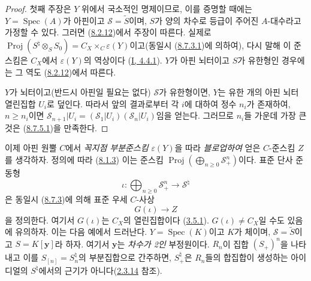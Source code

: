 \begin{proof}
첫째 주장은 $Y$ 위에서 국소적인 명제이므로, 이를 증명할 때에는
$Y=\operatorname{Spec}(A)$가 아핀이고 $\mathcal{S}=\widetilde{S}$이며,
$S$가 양의 차수로 등급이 주어진 $A$-대수라고 가정할 수 있다. 그러면
(\hyperref[II.8.2.12-ko]{8.2.12})에서 주장이 따른다. 실제로
$\operatorname{Proj}(S^{\natural}\otimes_S S_0)=
C_X\times_C\varepsilon(Y)$이고(동일시
(\hyperref[II.8.7.3.1-ko]{8.7.3.1})에 의하여), 다시 말해 이 준스킴은
$C_X$에서 $\varepsilon(Y)$의 역상이다
(\hyperref[I.4.4.1-ko]{I, 4.4.1}). $Y$가 아핀 뇌터이고 $S$가
유한형인 경우에는 그 역도 (\hyperref[II.8.2.12-ko]{8.2.12})에서 따른다.

$Y$가 뇌터이고(반드시 아핀일 필요는 없다) $\mathcal{S}$가 유한형이면,
$Y$는 유한 개의 아핀 뇌터 열린집합 $U_i$로 덮인다. 따라서 앞의
결과로부터 각 $i$에 대하여 정수 $n_i$가 존재하여, $n\geqslant n_i$이면
$\mathcal{S}_{n+1}|U_i=(\mathcal{S}_1|U_i)(\mathcal{S}_n|U_i)$임을 얻는다.
그러므로 $n_i$들 가운데 가장 큰 것은
(\hyperref[II.8.7.5.1-ko]{8.7.5.1})을 만족한다.
\end{proof}

\begin{env}[8.7.6]
\label{II.8.7.6-ko}
이제 아핀 원뿔 $C$에서 \emph{꼭지점 부분준스킴}
$\varepsilon(Y)$을 따라 \emph{블로업하여} 얻은 $C$-준스킴 $Z$를
생각하자. 정의에 따라 (\hyperref[II.8.1.3-ko]{8.1.3}) 이는 준스킴
$\operatorname{Proj}(\bigoplus_{n\geqslant 0}\mathcal{S}_+^n)$이다.
표준 단사 준동형
\begin{equation}
\label{II.8.7.6.1-ko}
  \iota:\bigoplus_{n\geqslant 0}\mathcal{S}_+^n
  \longrightarrow\mathcal{S}^{\natural}
\tag{8.7.6.1}
\end{equation}
은 동일시 (\hyperref[II.8.7.3-ko]{8.7.3})에 의해 표준 우세
$C$-사상
\begin{equation}
\label{II.8.7.6.2-ko}
  G(\iota)\longrightarrow Z
\tag{8.7.6.2}
\end{equation}
을 정의한다. 여기서 $G(\iota)$는 $C_X$의 열린집합이다
(\hyperref[II.3.5.1-ko]{3.5.1}). $G(\iota)\ne C_X$일 수도 있음에
유의하자. 이는 다음 예에서 드러난다. $Y=\operatorname{Spec}(K)$이고
$K$가 체이며, $\mathcal{S}=\widetilde{S}$이고 $S=K[\mathbf{y}]$라 하자.
여기서 $\mathbf{y}$는 \emph{차수가 2인} 부정원이다. $R_n$이 집합
$(S_+)^n$을 나타내고 이를 $S_{[n]}=S_n^{\natural}$의 부분집합으로
간주하면, $S_+^{\natural}$은 $R_n$들의 합집합이 생성하는 아이디얼의
$S^{\natural}$에서의 근기가 아니다(\hyperref[II.2.3.14-ko]{2.3.14} 참조).
\end{env}

